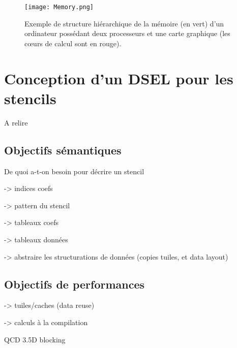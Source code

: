 \begin{figure}[!h]
  \caption{Exemple de structure hiérarchique de la mémoire (en vert) d'un ordinateur possédant deux processeurs et une carte graphique (les cœurs de calcul sont en rouge).}
  \label{fig:memoire_base}
  \texttt{[image: Memory.png]}
\end{figure}



\section{Conception d'un DSEL pour les stencils}

A relire \cite{Art22}

\subsection{Objectifs sémantiques}

De quoi a-t-on besoin pour décrire un stencil

-> indices coefs

-> pattern du stencil

-> tableaux coefs

-> tableaux données

-> abstraire les structurations de données (copies tuiles, et data layout)

\subsection{Objectifs de performances}


-> tuiles/caches (data reuse)

-> calculs à la compilation


QCD \cite{Art1}
3.5D blocking \cite{Art11}

